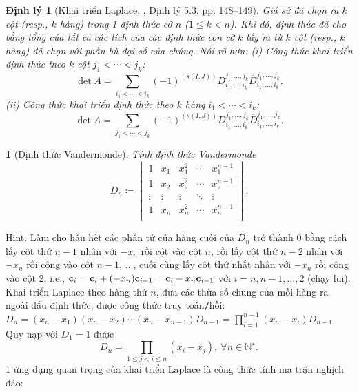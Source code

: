 \documentclass{article}
\newtheorem{baitoan}{}
\newtheorem{dinhly}{Định lý}
\begin{document}
\begin{dinhly}[Khai triển Laplace, \cite{Hung_linear_algebra}, Định lý 5.3, pp. 148--149]
	Giả sử đã chọn ra $k$ cột (resp., $k$ hàng) trong 1 định thức cỡ $n$ ($1\le k < n$). Khi đó, định thức đã cho bằng tổng của tất cả các tích của các định thức con cỡ $k$ lấy ra từ $k$ cột (resp., $k$ hàng) đã chọn với phần bù đại số của chúng. Nói rõ hơn: (i) Công thức khai triển định thức theo $k$ cột $j_1 < \cdots < j_k$:
	\begin{equation*}
		\det A = \sum_{i_1 < \cdots < i_k} (-1)^{(s(I,J))}D_{i_1,\ldots,i_k}^{j_1,\ldots,j_k}\overline{D}_{i_1,\ldots,i_k}^{j_1,\ldots,j_k}.
	\end{equation*}
	(ii) Công thức khai triển định thức theo $k$ hàng $i_1 < \cdots < i_k$:
	\begin{equation*}
		\det A = \sum_{j_1 < \cdots < j_k} (-1)^{(s(I,J))}D_{i_1,\ldots,i_k}^{j_1,\ldots,j_k}\overline{D}_{i_1,\ldots,i_k}^{j_1,\ldots,j_k}.
	\end{equation*}
\end{dinhly}

\begin{baitoan}[Định thức Vandermonde]
	Tính định thức Vandermonde
	\begin{equation*}
		D_n\coloneqq\begin{vmatrix}
			1 & x_1 & x_1^2 & \cdots & x_1^{n-1}\\
			1 & x_2 & x_2^2 & \cdots & x_2^{n-1}\\
			\vdots & \vdots & \vdots & \ddots & \vdots\\
			1 & x_n & x_n^2 & \cdots & x_n^{n-1}\\
		\end{vmatrix}.
	\end{equation*}
\end{baitoan}
{\sf Hint.} Làm cho hầu hết các phần tử của hàng cuối của $D_n$ trở thành 0 bằng cách lấy cột thứ $n - 1$ nhân với $-x_n$ rồi cột vào cột $n$, rồi lấy cột thứ $n - 2$ nhân với $-x_n$ rồi cộng vào cột $n - 1$, $\ldots$, cuối cùng lấy cột thứ nhất nhân với $-x_n$ rồi cộng vào cột 2, i.e., ${\bf c}_i = {\bf c}_i + (-x_n){\bf c}_{i-1} = {\bf c}_i - x_n{\bf c}_{i-1}$ với $i = n,n - 1,\ldots,2$ (chạy lui). Khai triển Laplace theo hàng thứ $n$, đưa các thừa số chung của mỗi hàng ra ngoài dấu định thức, được công thức truy toán{\tt/}hồi: $D_n = (x_n - x_1)(x_n - x_2)\cdots(x_n - x_{n-1})D_{n-1} = \prod_{i=1}^{n-1} (x_n - x_i)D_{n-1}$. Quy nạp với $D_1 = 1$ được
\begin{equation}
	\label{Vandermonde det}
	\tag{Vandermonde}
	D_n = \prod_{1\le j < i\le n} (x_i - x_j),\ \forall n\in\mathbb{N}^\star.
\end{equation}
1 ứng dụng quan trọng của khai triển Laplace là công thức tính ma trận nghịch đảo:
\end{document}

